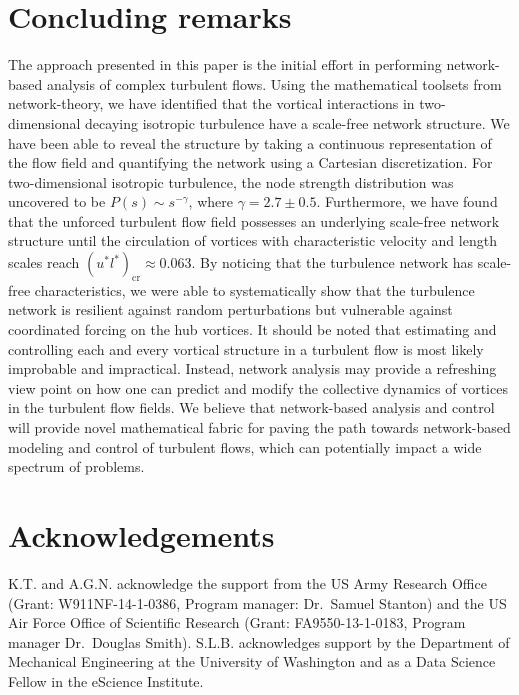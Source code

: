 \documentclass{jfm}
\begin{document}
\section{Concluding remarks}

The approach presented in this paper is the initial effort in performing network-based analysis of complex turbulent flows.  Using the mathematical toolsets from network-theory, we have identified that the vortical interactions in two-dimensional decaying isotropic turbulence have a scale-free network structure.  We have been able to reveal the structure by taking a continuous representation of the flow field and quantifying the network using a Cartesian discretization.  For two-dimensional isotropic turbulence, the node strength distribution was uncovered to be $P(s) \sim s^{-\gamma}$, where $\gamma = 2.7 \pm 0.5$.  Furthermore, we have found that the unforced turbulent flow field possesses an underlying scale-free network structure until the circulation of vortices with characteristic velocity and length scales reach $(u^* l^*)_\text{cr} \approx 0.063$.  By noticing that the turbulence network has scale-free characteristics, we were able to systematically show that the turbulence network is resilient against random perturbations but vulnerable against coordinated forcing on the hub vortices.  It should be noted that estimating and controlling each and every vortical structure in a turbulent flow is most likely improbable and impractical.  Instead, network analysis may provide a refreshing view point on how one can predict and modify the collective dynamics of vortices in the turbulent flow fields.  We believe that network-based analysis and control \citep{Mesbahi10, Liu:Nature11, Cornelius:NatureComm13, Kaiser:JFM14, Yan:NaturePhysics15} will provide novel mathematical fabric for paving the path towards network-based modeling and control of turbulent flows, which can potentially impact a wide spectrum of problems. 




\section*{Acknowledgements}

K.T. and A.G.N. acknowledge the support from the US Army Research Office (Grant: W911NF-14-1-0386, Program manager: Dr.~Samuel Stanton) and the US Air Force Office of Scientific Research (Grant: FA9550-13-1-0183, Program manager Dr.~Douglas Smith).  S.L.B. acknowledges support by the Department of Mechanical Engineering at the University of Washington and as a Data Science Fellow in the eScience Institute.  





\end{document}

